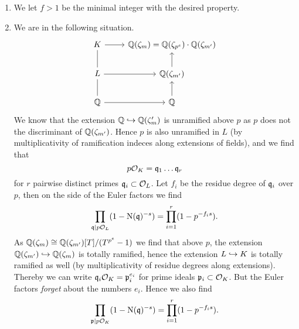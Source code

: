 \documentclass[a4paper,11pt]{article}
\begin{document}
\begin{enumerate}[wide, labelindent=0pt]
    \item We let $f>1$ be the minimal integer with the desired property. 
    \item We are in the following situation.
\[      \begin{tikzcd}[ampersand replacement=\&]
	    K \& {\Q(\zeta_m) = \Q(\zeta_{p^e}) \cdot \Q(\zeta_{m'})} \\
	    L \& {\Q(\zeta_{m'})} \\
	    \Q \& \Q
	    \arrow[from=2-2, to=1-2]
	    \arrow[no head, from=2-1, to=1-1]
	    \arrow[no head, from=3-1, to=2-1]
	    \arrow[from=1-1, to=1-2]
	    \arrow[from=2-1, to=2-2]
	    \arrow[from=3-1, to=3-2]
	    \arrow[from=3-2, to=2-2]
    \end{tikzcd}
\]
        We know that the extension $\mathbb{Q} \hookrightarrow \mathbb{Q}(\zeta_m')$ is unramified above $p$
        as $p$ does not the discriminant of $\mathbb{Q}(\zeta_{m'})$. Hence $p$ is also 
        unramified in $L$ (by multiplicativity of ramification indeces along 
        extensions of fields), and we find that 
        \begin{equation*}
            p\mathcal{O}_K = \mathfrak{q}_1 \dots \mathfrak{q}_r
        \end{equation*}
        for $r$ pairwise distinct primes $\mathfrak{q}_i \subset \mathcal{O}_L$. Let $f_i$ be the
        residue degree of $\mathfrak{q}_i$ over $p$, then on the side of the Euler factors
        we find
        \begin{equation*}
            \prod_{\mathfrak{q} \mid p\mathcal{O}_L}(1 - \operatorname{N}(\mathfrak{q})^{-s}) = 
            \prod_{i=1}^r(1 - p^{-f_is}).
        \end{equation*}
        As $\mathbb{Q}(\zeta_m) \cong \mathbb{Q}(\zeta_{m'})[T]/(T^{p^e}-1)$ we find that above $p$,
        the extension $\mathbb{Q}(\zeta_{m'}) \hookrightarrow \mathbb{Q}(\zeta_m)$ is totally ramified, hence
        the extension $L \hookrightarrow K$ is totally ramified as well (by multiplicativity of 
        residue degrees along extensions). Thereby we can write 
        $\mathfrak{q}_i \mathcal{O}_K = \mathfrak{p}_i^{e_i}$ for prime ideals $\mathfrak{p}_i \subset \mathcal{O}_K$. But the 
        Euler factors \emph{forget} about the numbers $e_i$. Hence we also find
        \begin{equation*}
            \prod_{\mathfrak{p} \mid p\mathcal{O}_K}(1 - \operatorname{N}(\mathfrak{q})^{-s}) = 
            \prod_{i=1}^r(1 - p^{-f_is}).
        \end{equation*}


\end{enumerate}
\end{document}
